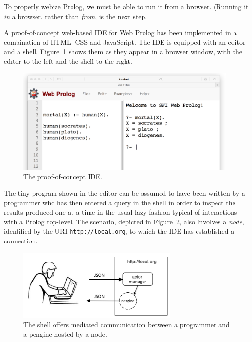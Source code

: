 \documentclass{tlp}
\begin{document}
\noindent To properly webize Prolog, we must be able to run it from a browser. (Running it \textit{in} a browser, rather than \textit{from}, is the next step. 

A proof-of-concept web-based IDE for Web Prolog has been implemented in a combination of HTML, CSS and JavaScript. The IDE is equipped with an editor and a shell. Figure~\ref{fig:swish-first} shows them as they appear in a browser window, with the editor to the left and the shell to the right.

\begin{figure}[h]
    \centering
	\includegraphics[width=11cm]{swish-2}
    \caption{The proof-of-concept IDE.}
    \label{fig:swish-first}
\end{figure}

\noindent The tiny program shown in the editor can be assumed to have been written by a programmer who has then entered a query in the shell in order to inspect the results produced one-at-a-time in the usual lazy fashion typical of interactions with a Prolog top-level. The scenario, depicted in Figure~\ref{fig:swish-pengine-interaction}, also involves a \textit{node}, identified by the URI \texttt{http://local.org}, to which the IDE has established a connection.

\begin{figure}[h]
    \centering
	\includegraphics[width=8cm]{swish-pengine-interaction}
    \caption{The shell offers mediated communication between a programmer and a pengine hosted by a node.}
    \label{fig:swish-pengine-interaction}
\end{figure}
\end{document}
